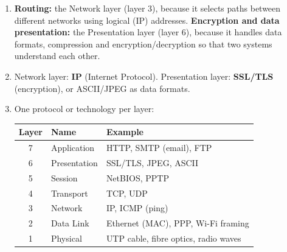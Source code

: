\documentclass[11pt]{article}
\newcommand{\cle}[1]{{\popxbold\color{popdark}#1}}
\begin{document}
\begin{corrige}
\begin{enumerate}
\item \textbf{Routing:} the \cle{Network layer} (layer 3), because it selects paths between different networks using logical (IP) addresses. \textbf{Encryption and data presentation:} the \cle{Presentation layer} (layer 6), because it handles data formats, compression and encryption/decryption so that two systems understand each other.
\item Network layer: \textbf{IP} (Internet Protocol). Presentation layer: \textbf{SSL/TLS} (encryption), or ASCII/JPEG as data formats.
\item One protocol or technology per layer:
\begin{center}
\begin{tabularx}{\linewidth}{|c|l|X|}
\hline
\rowcolor{popblueL} \textbf{Layer} & \textbf{Name} & \textbf{Example} \\
\hline
7 & Application & HTTP, SMTP (email), FTP \\
\hline
6 & Presentation & SSL/TLS, JPEG, ASCII \\
\hline
5 & Session & NetBIOS, PPTP \\
\hline
4 & Transport & TCP, UDP \\
\hline
3 & Network & IP, ICMP (ping) \\
\hline
2 & Data Link & Ethernet (MAC), PPP, Wi-Fi framing \\
\hline
1 & Physical & UTP cable, fibre optics, radio waves \\
\hline
\end{tabularx}
\end{center}
\end{enumerate}
\end{corrige}
\end{document}
